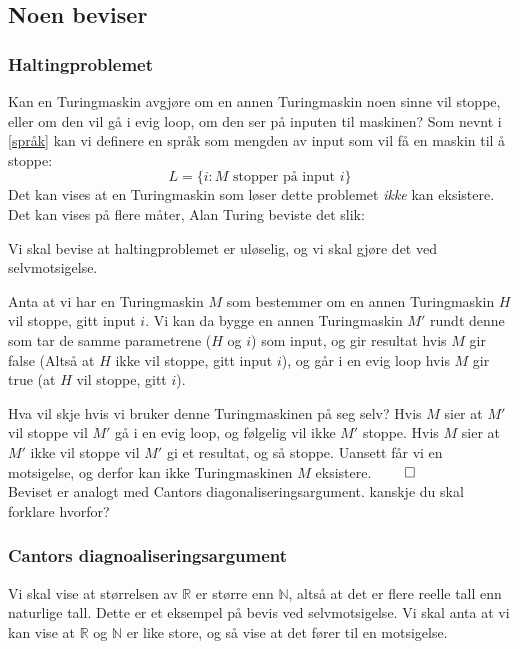 \subsection{Noen beviser}
\subsubsection{Haltingproblemet}
Kan en Turingmaskin avgjøre om en annen Turingmaskin noen sinne vil stoppe, eller om den vil gå i evig loop, om den ser på inputen til maskinen? Som nevnt i \ref{språk} kan vi definere en språk som mengden av input som vil få en maskin til å stoppe:
\[ L = \{i : M \text{ stopper på input } i \} \]
Det kan vises at en Turingmaskin som løser dette problemet \emph{ikke} kan eksistere. Det kan vises på flere måter, Alan Turing beviste det slik:

\label{haltingProof}
Vi skal bevise at haltingproblemet er uløselig, og vi skal gjøre det ved selvmotsigelse. 

Anta at vi har en Turingmaskin $ M $ som bestemmer om en annen Turingmaskin $ H $ vil stoppe, gitt input $ i $. Vi kan da bygge en annen Turingmaskin $ M' $ rundt denne som tar de samme parametrene ($ H $ og $ i $) som input, og gir resultat hvis $ M $ gir false (Altså at $ H $ ikke vil stoppe, gitt input $ i $), og går i en evig loop hvis $ M $ gir true (at $ H $ vil stoppe, gitt $ i $). 

Hva vil skje hvis vi bruker denne Turingmaskinen på seg selv? Hvis $ M $ sier at $ M' $ vil stoppe vil $ M' $ gå i en evig loop, og følgelig vil ikke $ M' $ stoppe. Hvis $ M $ sier at $ M' $ ikke vil stoppe vil $ M' $ gi et resultat, og så stoppe. Uansett får vi en motsigelse, og derfor kan ikke Turingmaskinen $ M $ eksistere. $ \hfill\qed $ \\

\noindent Beviset er analogt med Cantors diagonaliseringsargument. \color{red} kanskje du skal forklare hvorfor?\color{black}

\subsubsection{Cantors diagnoaliseringsargument}
Vi skal vise at størrelsen av $ \mathbb{R} $ er større enn $ \mathbb{N} $, altså at det er flere reelle tall enn naturlige tall. Dette er et eksempel på bevis ved selvmotsigelse. Vi skal anta at vi kan vise at $ \mathbb{R} $ og $ \mathbb{N} $ er like store, og så vise at det fører til en motsigelse.

